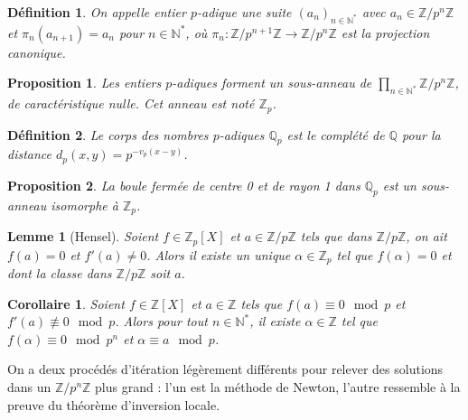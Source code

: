 \documentclass[a4paper, 11pt]{article}
\def\Z{\mathbb{Z}}
\def\N{\mathbb{N}}
\def\Q{\mathbb{Q}}
\newtheorem*{definition}{Définition}
\newtheorem*{proposition}{Proposition}
\newtheorem*{lemma}{Lemme}
\newtheorem*{corollary}{Corollaire}
\begin{document}
\begin{definition}
  On appelle \emph{entier $p$-adique} une suite $(a_n)_{n \in \N^*}$
  avec $a_n \in \Z/p^n\Z$ et $\pi_n(a_{n+1}) = a_n$ pour $n \in \N^*$,
  où $\pi_n : \Z/p^{n+1}\Z \to \Z/p^n\Z$ est la projection canonique.
\end{definition}
\begin{proposition}
  Les entiers $p$-adiques forment un sous-anneau de
  $\prod_{n \in \N^*} \Z/p^n\Z$, de caractéristique nulle. Cet anneau
  est noté $\Z_p$.
\end{proposition}

\begin{definition}
  Le \emph{corps des nombres $p$-adiques} $\Q_p$ est le complété de
  $\Q$ pour la distance $d_p(x,y) = p^{-v_p(x-y)}$.
\end{definition}
\begin{proposition}
  La boule fermée de centre 0 et de rayon 1 dans $\Q_p$ est un
  sous-anneau isomorphe à $\Z_p$.
\end{proposition}

\begin{lemma}[Hensel]
  Soient $f \in \Z_p[X]$ et $a \in \Z/p\Z$ tels que dans $\Z/p\Z$, on
  ait $f(a) = 0$ et $f'(a) \neq 0$. Alors il existe un unique
  $\alpha \in \Z_p$ tel que $f(\alpha) = 0$ et dont la classe dans
  $\Z/p\Z$ soit $a$.
\end{lemma}

\begin{corollary}
  Soient $f \in \Z[X]$ et $a \in \Z$ tels que $f(a) \equiv 0 \mod p$
  et $f'(a) \not\equiv 0 \mod p$. Alors pour tout $n \in \N^*$, il
  existe $\alpha \in \Z$ tel que $f(\alpha) \equiv 0 \mod p^n$ et
  $\alpha \equiv a \mod p$.
\end{corollary}

On a deux procédés d'itération légèrement différents pour relever des solutions
dans un $\Z/p^n\Z$ plus grand : l'un est la méthode de Newton, l'autre ressemble
à la preuve du théorème d'inversion locale.
\end{document}
